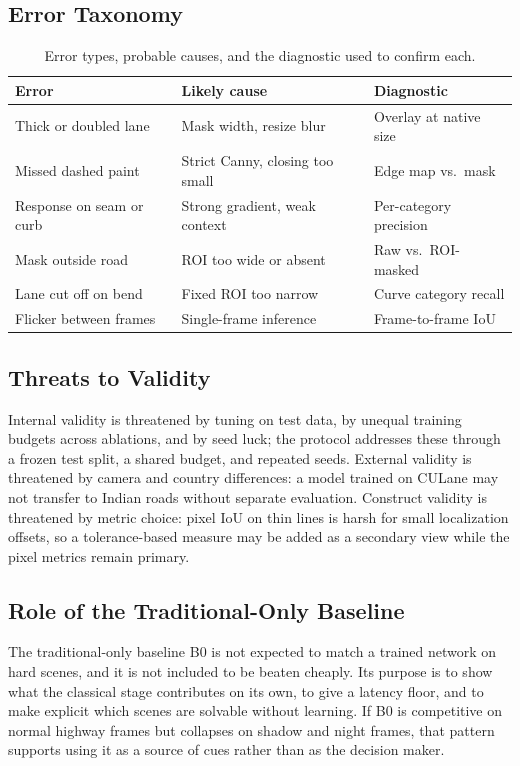 \documentclass[10pt,a4paper,twocolumn]{article}
\begin{document}
\subsection{Error Taxonomy}
\begin{table}[H]
\centering
\caption{Error types, probable causes, and the diagnostic used to confirm each.}
\footnotesize
\begin{tabularx}{\columnwidth}{|X|X|X|}
\hline
\rowcolor{gray!18}\textbf{Error}&\textbf{Likely cause}&\textbf{Diagnostic}\\ \hline
Thick or doubled lane & Mask width, resize blur & Overlay at native size\\ \hline
Missed dashed paint & Strict Canny, closing too small & Edge map vs.\ mask\\ \hline
Response on seam or curb & Strong gradient, weak context & Per-category precision\\ \hline
Mask outside road & ROI too wide or absent & Raw vs.\ ROI-masked\\ \hline
Lane cut off on bend & Fixed ROI too narrow & Curve category recall\\ \hline
Flicker between frames & Single-frame inference & Frame-to-frame IoU\\ \hline
\end{tabularx}
\end{table}

\subsection{Threats to Validity}
Internal validity is threatened by tuning on test data, by unequal training budgets across ablations, and by seed luck; the protocol addresses these through a frozen test split, a shared budget, and repeated seeds. External validity is threatened by camera and country differences: a model trained on CULane may not transfer to Indian roads without separate evaluation. Construct validity is threatened by metric choice: pixel IoU on thin lines is harsh for small localization offsets, so a tolerance-based measure may be added as a secondary view while the pixel metrics remain primary.

\subsection{Role of the Traditional-Only Baseline}
The traditional-only baseline B0 is not expected to match a trained network on hard scenes, and it is not included to be beaten cheaply. Its purpose is to show what the classical stage contributes on its own, to give a latency floor, and to make explicit which scenes are solvable without learning. If B0 is competitive on normal highway frames but collapses on shadow and night frames, that pattern supports using it as a source of cues rather than as the decision maker.
\end{document}
